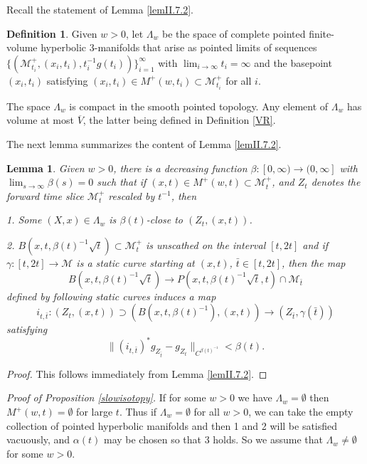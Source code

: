 \documentclass[12pt]{amsart}
\newcommand{\La}{\Lambda}
\newcommand{\M}{{\mathcal M}}
\newcommand{\ga}{\gamma}
\newcommand{\ra}{\rightarrow}
\numberwithin{equation}{section}
\theoremstyle{plain}
\newtheorem{lemma}[equation]{Lemma}
\theoremstyle{definition}
\newtheorem{definition}[equation]{Definition}
\theoremstyle{remark}
\begin{document}
Recall the statement of Lemma \ref{lemII.7.2}.

\begin{definition}
Given $w >0$, let $\Lambda_w$ be the space 
of complete pointed finite-volume hyperbolic
$3$-manifolds that arise as pointed limits of
sequences $\{(\M^+_{t_i}, (x_i, t_i), t_i^{-1} g(t_i))\}_{i=1}^\infty$
with $\lim_{i \rightarrow \infty} t_i = \infty$ and the basepoint
$(x_i,t_i)$ satisfying
$(x_i,t_i) \in M^+(w, t_i) \subset \M^+_{t_i}$
for all $i$.
\end{definition}

The space $\La_w$ is compact in the smooth pointed topology.
Any element of $\La_w$ has volume at most $\overline{V}$,
the latter being defined in Definition \ref{VR}.

The next lemma summarizes the content of Lemma \ref{lemII.7.2}.

\bigskip
\begin{lemma}
\label{II.7.2again}
Given $w>0$, there is a decreasing function 
$\beta:[0,\infty)\ra (0,\infty]$
with $\lim_{s\ra\infty}\beta(s)=0$ such that 
if  
$(x,t)\in M^+(w,t)\subset\M_t^+$,
and  $Z_t$ denotes
the forward time slice
$\M_t^+$ rescaled by $t^{-1}$, then

1.  Some $(X,x)\in \La_w$
is $\beta(t)$-close to $(Z_t,(x,t))$.

2.  
$B(x,t,\beta(t)^{-1}\sqrt{t})\subset \M_t^+$
is unscathed
on the interval $[t,2t]$ and if $\ga:[t,2t]\ra \M$ is a static
curve starting at $(x,t)$, $\bar t\in [t,2t]$, then the map 
\begin{equation}
B(x,t,\beta(t)^{-1}\sqrt{t})\ra 
P(x,t,\beta(t)^{-1}\sqrt{t},t)\cap\M_{\bar t}
\end{equation}
defined by following static curves induces a map
\begin{equation}
i_{t,\bar t}:(Z_t,(x,t))\supset (B(x,t,\beta(t)^{-1}),(x,t))
\ra (Z_{\bar t},\ga(\bar t))
\end{equation}
satisfying 
\begin{equation}
\|\left(i_{t,\bar t}\right)^*g_{Z_{\bar
t}}-g_{Z_t}\|_{C^{\beta(t)^{-1}}}
<\beta(t).
\end{equation}
\end{lemma} 
\begin{proof}
This follows immediately from Lemma \ref{lemII.7.2}.
\end{proof}

\bigskip
\noindent
{\em Proof of Proposition \ref{slowisotopy}.}
If for some $w>0$ we have $\La_w=\emptyset$ then
$M^+(w,t)=\emptyset$ for large $t$.  Thus if 
$\La_w=\emptyset$ for all $w>0$,  we can take
the empty collection of pointed hyperbolic manifolds
and then 1 and 2 will be satisfied vacuously, 
and $\alpha(t)$ may be chosen so that 3 holds.
So we assume that $\La_w\neq\emptyset$ for some $w>0$. 
\end{document}
